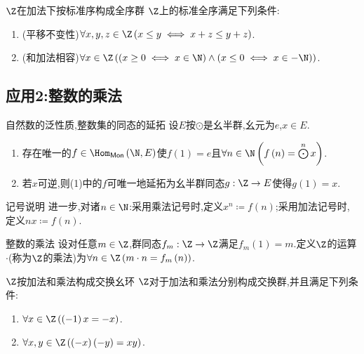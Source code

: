 \begin{theorem}{$\Z$在加法下按标准序构成全序群}{}
	$\Z$上的标准全序满足下列条件:
	\begin{enumerate}
		\item (平移不变性)$\forall x,y,z\in\Z\left(x\leq y\iff x+z\leq y+z\right)$.
		\item (和加法相容)$\forall x\in\Z\left(\left(x\geq 0\iff x\in\N\right)\wedge\left(x\leq 0\iff x\in -\N\right)\right)$.
	\end{enumerate}
\end{theorem}

\subsection*{应用2:整数的乘法}

\begin{lemma}{自然数的泛性质,整数集的同态的延拓}{}
	设$E$按$\odot$是幺半群,幺元为$e$,$x\in E$.
	\begin{enumerate}
		\item 存在唯一的$f\in\Hom_{\mathsf{Mon}}\left(\N,E\right)$使$f\left(1\right)=e$且$\forall n\in\N\left(f\left(n\right)=\bigodot\limits^{n}x\right)$.
		\item 若$x$可逆,则(1)中的$f$可唯一地延拓为幺半群同态$g:\Z\to E$使得$g\left(1\right)=x$.
	\end{enumerate}
\end{lemma}

\begin{remark}{记号说明}{}
	进一步,对诸$n\in\N$:采用乘法记号时,定义$x^{n}\coloneq f\left(n\right)$;采用加法记号时,定义$nx\coloneq f\left(n\right)$.
\end{remark}

\begin{definition}{整数的乘法}{}
	设对任意$m\in\Z$,群同态$f_{m}:\Z\to\Z$满足$f_{m}\left(1\right)=m$.定义$\Z$的运算$\cdot$(称为$\Z$的乘法)为$\forall n\in\Z\left(m\cdot n=f_{m}\left(n\right)\right)$.
\end{definition}

\begin{theorem}{$\Z$按加法和乘法构成交换幺环}{}
	$\Z$对于加法和乘法分别构成交换群,并且满足下列条件:
	\begin{enumerate}
		\item $\forall x\in\Z\left(\left(-1\right)x=-x\right)$.
		\item $\forall x,y\in\Z\left(\left(-x\right)\left(-y\right)=xy\right)$.
	\end{enumerate}
\end{theorem}

